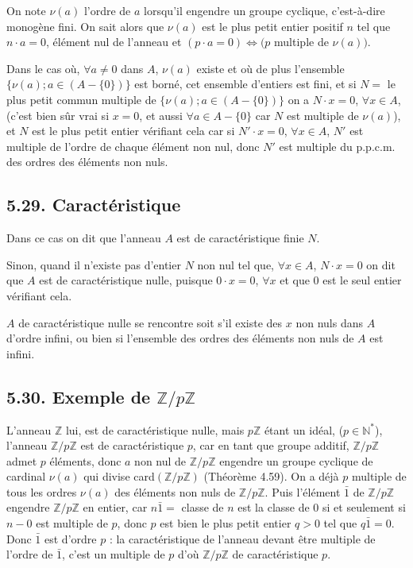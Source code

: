 On note $\nu(a)$ l'ordre de $a$ lorsqu'il engendre un groupe cyclique, c'est-à-dire monogène fini. On sait alors que $\nu(a)$ est le plus petit entier positif $n$ tel que $n\cdot a=0$, élément nul de l'anneau et $(p\cdot a=0)\Longleftrightarrow(p$ multiple de $\nu(a))$.

Dans le cas où, $\forall a\ne0$ dans $A$, $\nu(a)$ existe et où de plus l'ensemble $\{\nu(a);a\in(A-\{0\})\}$ est borné, cet ensemble d'entiers est fini, et si $N=$ le plus petit commun multiple de $\{\nu(a);a\in(A-\{0\})\}$ on a $N\cdot x=0$, $\forall x\in A$, (c'est bien sûr vrai si $x=0$, et aussi $\forall a\in A-\{0\}$ car $N$ est multiple de $\nu(a)$), et $N$ est le plus petit entier vérifiant cela car si $N'\cdot x=0$, $\forall x\in A$, $N'$ est multiple de l'ordre de chaque élément non nul, donc $N'$ est multiple du p.p.c.m. des ordres des éléments non nuls.

\subsection*{5.29. Caractéristique}
Dans ce cas on dit que l'anneau $A$ est de caractéristique finie $N$.

Sinon, quand il n'existe pas d'entier $N$ non nul tel que, $\forall x\in A$, $N\cdot x=0$ on dit que $A$ est de caractéristique nulle, puisque $0\cdot x=0$, $\forall x$ et que 0 est le seul entier vérifiant cela.

$A$ de caractéristique nulle se rencontre soit s'il existe des $x$ non nuls dans $A$ d'ordre infini, ou bien si l'ensemble des ordres des éléments non nuls de $A$ est infini.

\subsection*{5.30. Exemple de $\mathbb Z/p\mathbb Z$}
L'anneau $\mathbb Z$ lui, est de caractéristique nulle, mais $p\mathbb Z$ étant un idéal, ($p\in\mathbb N^*$), l'anneau $\mathbb Z/p\mathbb Z$ est de caractéristique $p$, car en tant que groupe additif, $\mathbb Z/p\mathbb Z$ admet $p$ éléments, donc $a$ non nul de $\mathbb Z/p\mathbb Z$ engendre un groupe cyclique de cardinal $\nu(a)$ qui divise card$(\mathbb Z/p\mathbb Z)$ (Théorème 4.59). On a déjà $p$ multiple de tous les ordres $\nu(a)$ des éléments non nuls de $\mathbb Z/p\mathbb Z$. Puis l'élément $\bar1$ de $\mathbb Z/p\mathbb Z$ engendre $\mathbb Z/p\mathbb Z$ en entier, car $n\bar1=$ classe de $n$ est la classe de 0 si et seulement si $n-0$ est multiple de $p$, donc $p$ est bien le plus petit entier $q>0$ tel que $q\bar1=0$. Donc $\bar1$ est d'ordre $p$ : la caractéristique de l'anneau devant être multiple de l'ordre de $\bar1$, c'est un multiple de $p$ d'où $\mathbb Z/p\mathbb Z$ de caractéristique $p$. \bookend

